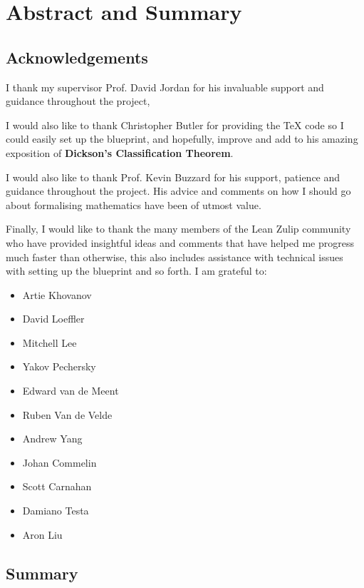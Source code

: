 \chapter{Abstract and Summary}\label{Ch1_AbstractAndAcknowledgements}

\section{Acknowledgements}

I thank my supervisor Prof. David Jordan for his invaluable support and guidance throughout the project,

I would also like to thank Christopher Butler for providing the TeX code so I could easily set up the blueprint, and hopefully, improve and add to his amazing exposition of
\textbf{Dickson's Classification Theorem}.

I would also like to thank Prof. Kevin Buzzard for his support, patience and guidance throughout the project. His advice and comments on how I should go about formalising mathematics have been of utmost value. 

Finally, I would like to thank the many members of the Lean Zulip community who have provided insightful ideas and comments that have helped me progress much faster than otherwise, 
this also includes assistance with technical issues with setting up the blueprint and so forth. I am grateful to:

\begin{itemize}
    \item Artie Khovanov
    \item David Loeffler
    \item Mitchell Lee
    \item Yakov Pechersky
    \item Edward van de Meent
    \item Ruben Van de Velde
    \item Andrew Yang
    \item Johan Commelin
    \item Scott Carnahan
    \item Damiano Testa
    \item Aron Liu
\end{itemize}

\section{Summary}

